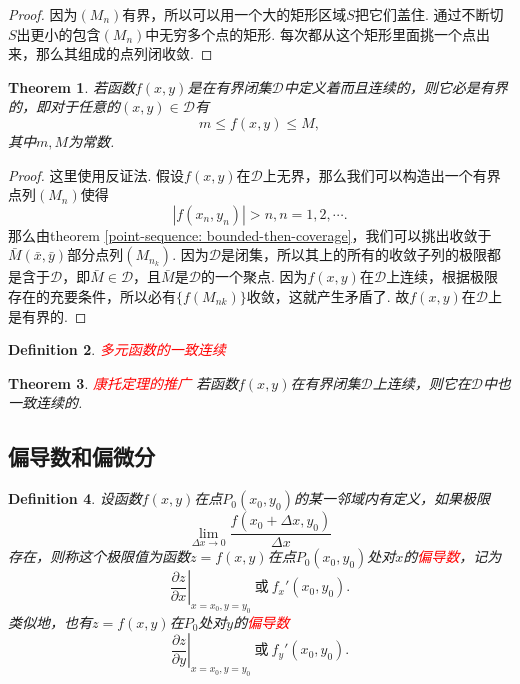 \documentclass{article}
\newtheorem{theorem}{Theorem}[section]
\newtheorem{definition}[theorem]{Definition}
\newcommand{\redt}[1]{\textcolor{red}{#1}}
\begin{document}
\begin{proof}
因为$(M_n)$有界，所以可以用一个大的矩形区域$S$把它们盖住. 通过不断切$S$出更小的包含$(M_n)$中无穷多个点的矩形. 每次都从这个矩形里面挑一个点出来，那么其组成的点列闭收敛. 
\end{proof}

\begin{theorem}
\rm  若函数$f(x,y)$是在有界闭集$\mathcal{D}$中定义着而且连续的，则它必是有界的，即对于任意的$(x,y) \in \mathcal{D}$有
$$
m \leq f(x,y) \leq M,
$$
其中$m,M$为常数.
\end{theorem}

\begin{proof}
\rm 这里使用反证法. 假设$f(x,y)$在$\mathcal{D}$上无界，那么我们可以构造出一个有界点列$(M_n)$使得
$$
|f(x_n,y_n)| > n , n =1,2,\cdots.
$$
那么由theorem \ref{point-sequence: bounded-then-coverage}，我们可以挑出收敛于$\bar{M}(\bar{x},\bar{y})$部分点列$(M_{n_k})$. 因为$\mathcal{D}$是闭集，所以其上的所有的收敛子列的极限都是含于$\mathcal{D}$，即$\bar{M} \in \mathcal{D}$，且$\bar{M}$是$\mathcal{D}$的一个聚点. 因为$f(x,y)$在$\mathcal{D}$上连续，根据极限存在的充要条件，所以必有$\{f(M_{nk})\}$收敛，这就产生矛盾了. 故$f(x,y)$在$\mathcal{D}$上是有界的. 
\end{proof}

\begin{definition}
\rm \redt{多元函数的一致连续} 
\end{definition}

\begin{theorem}
\rm \redt{康托定理的推广} 若函数$f(x,y)$在有界闭集$\mathcal{D}$上连续，则它在$\mathcal{D}$中也一致连续的. 
\end{theorem}

\newpage
\subsection{偏导数和偏微分}

\begin{definition}
\rm 设函数$f(x,y)$在点$P_0(x_0,y_0)$的某一邻域内有定义，如果极限
$$
\lim\limits_{\Delta x \to 0} \frac{f(x_0 + \Delta x,y_0)}{\Delta x}
$$
存在，则称这个极限值为函数$z = f(x,y)$在点$P_0(x_0,y_0)$处对$x$的\redt{偏导数}，记为
$$
\left.\frac{\partial z}{\partial x}\right|_{x=x_0,y=y_0} ~\text{或}~ f_x'(x_0,y_0).
$$
类似地，也有$z=f(x,y)$在$P_0$处对$y$的\redt{偏导数}
$$
\left.\frac{\partial z}{\partial y}\right|_{x=x_0,y=y_0} ~\text{或}~ f_y'(x_0,y_0).
$$
\end{definition}
\end{document}
